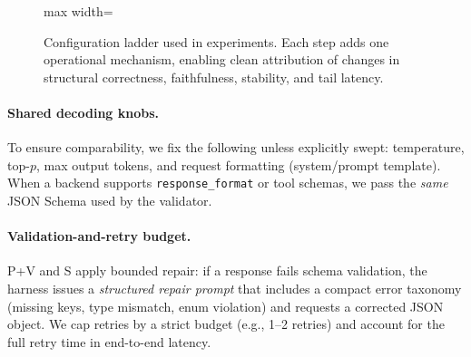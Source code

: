 \documentclass[11pt]{article}
\begin{document}
\begin{figure}[t]
\centering
\begin{adjustbox}{max width=\linewidth}
\end{adjustbox}
\caption{Configuration ladder used in experiments.
Each step adds one operational mechanism, enabling clean attribution of changes in structural correctness, faithfulness, stability, and tail latency.}
\label{fig:config-ladder}
\end{figure}

\paragraph{Shared decoding knobs.}
To ensure comparability, we fix the following unless explicitly swept:
temperature, top-$p$, max output tokens, and request formatting (system/prompt template).
When a backend supports \texttt{response\_format} or tool schemas, we pass the \emph{same} JSON Schema used by the validator.

\paragraph{Validation-and-retry budget.}
P+V and S apply bounded repair: if a response fails schema validation, the harness issues a \emph{structured repair prompt} that includes a compact error taxonomy (missing keys, type mismatch, enum violation) and requests a corrected JSON object.
We cap retries by a strict budget (e.g., 1--2 retries) and account for the full retry time in end-to-end latency.
\end{document}

